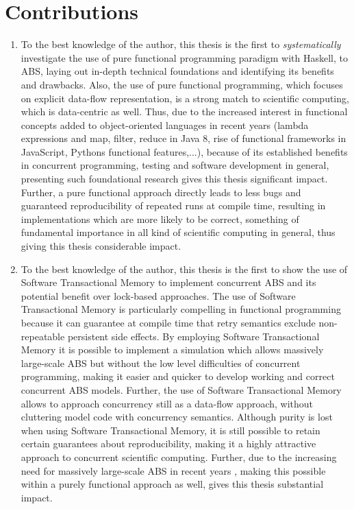 \section{Contributions}
\begin{enumerate}
	\item To the best knowledge of the author, this thesis is the first to \textit{systematically} investigate the use of pure functional programming paradigm with Haskell, to ABS, laying out in-depth technical foundations and identifying its benefits and drawbacks. Also, the use of pure functional programming, which focuses on explicit data-flow representation, is a strong match to scientific computing, which is data-centric as well. Thus, due to the increased interest in functional concepts added to object-oriented languages in recent years (lambda expressions and map, filter, reduce in Java 8, rise of functional frameworks in JavaScript, Pythons functional features,...), because of its established benefits in concurrent programming, testing and software development in general, presenting such foundational research gives this thesis significant impact. Further, a pure functional approach directly leads to less bugs and guaranteed reproducibility of repeated runs at compile time, resulting in implementations which are more likely to be correct, something of fundamental importance in all kind of scientific computing in general, thus giving this thesis considerable impact.
	
	\item To the best knowledge of the author, this thesis is the first to show the use of Software Transactional Memory to implement concurrent ABS and its potential benefit over lock-based approaches. The use of Software Transactional Memory is particularly compelling in functional programming because it can guarantee at compile time that retry semantics exclude non-repeatable persistent side effects. By employing Software Transactional Memory it is possible to implement a simulation which allows massively large-scale ABS but without the low level difficulties of concurrent programming, making it easier and quicker to develop working and correct concurrent ABS models. Further, the use of Software Transactional Memory allows to approach concurrency still as a data-flow approach, without cluttering model code with concurrency semantics. Although purity is lost when using Software Transactional Memory, it is still possible to retain certain guarantees about reproducibility, making it a highly attractive approach to concurrent scientific computing. Further, due to the increasing need for massively large-scale ABS in recent years \cite{lysenko_framework_2008}, making this possible within a purely functional approach as well, gives this thesis substantial impact.
	

\end{enumerate}
